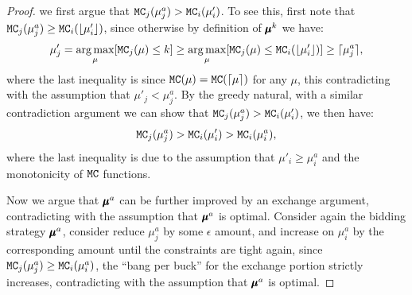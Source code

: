 {\begin{proof}
we first argue that $\texttt{MC}_j(\mu^a_j) > \texttt{MC}_i(\mu'_i)$. To see this, first note that $\texttt{MC}_j(\mu^a_j) \geq \texttt{MC}_i(\lfloor\mu'_i\rfloor)$, since otherwise by definition of $\pmb{\mu}^k$ we have:
\[\mu'_j = \operatorname*{arg\,max}_{\mu} [\texttt{MC}_j(\mu) \leq k] \geq \operatorname*{arg\,max}_{\mu} [\texttt{MC}_j(\mu) \leq \texttt{MC}_i(\lfloor\mu'_i\rfloor)] \geq \lceil\mu^a_j\rceil,\]
where the last inequality is since $\texttt{MC}(\mu) = \texttt{MC}(\lceil\mu\rceil)$ for any $\mu$, this contradicting with the assumption that $\mu'_j <\mu^a_j$. By the greedy natural, with a similar contradiction argument we can show that $\texttt{MC}_j(\mu^a_j) > \texttt{MC}_i(\mu'_i)$, we then have:
\begin{align}\label{eq:contradiction_fractionalopt}
    \texttt{MC}_j(\mu^a_j) > \texttt{MC}_i(\mu'_i) > \texttt{MC}_i(\mu^a_i),
\end{align}
where the last inequality is due to the assumption that $\mu'_i \geq \mu^a_i$ and the monotonicity of $\texttt{MC}$ functions. 

\begin{center}
\end{center}

Now we argue that $\pmb{\mu}^a$ can be further improved by an exchange argument, contradicting with the assumption that $\pmb{\mu}^a$ is optimal. Consider again the bidding strategy $\pmb{\mu}^a$, consider reduce $\mu^a_j$ by some $\epsilon$ amount, and increase on $\mu^a_i$ by the corresponding amount until the constraints are tight again, since $\texttt{MC}_j(\mu^a_j) \geq \texttt{MC}_i(\mu^a_i)$, the ``bang per buck'' for the exchange portion strictly increases, contradicting with the assumption that $\pmb{\mu}^a$ is optimal.
\end{proof}
}


